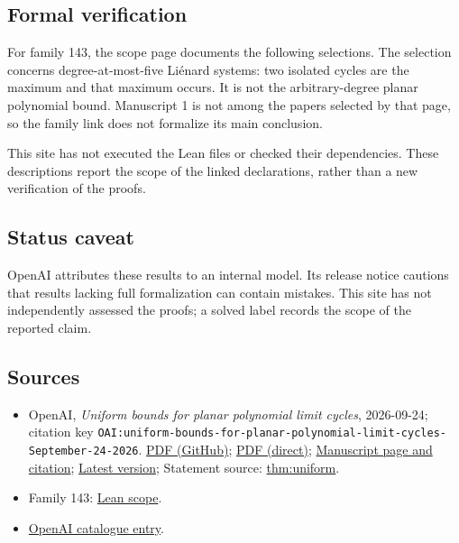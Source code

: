 \documentclass[11pt]{article}
\begin{document}
\subsection{Formal verification}
For family 143, the scope page documents the following selections. The selection concerns degree-at-most-five Liénard systems: two isolated cycles are the maximum and that maximum occurs. It is not the arbitrary-degree planar polynomial bound. Manuscript 1 is not among the papers selected by that page, so the family link does not formalize its main conclusion.

This site has not executed the Lean files or checked their dependencies. These descriptions report the scope of the linked declarations, rather than a new verification of the proofs.

\subsection{Status caveat}
OpenAI attributes these results to an internal model. Its release notice cautions that results lacking full formalization can contain mistakes. This site has not independently assessed the proofs; a solved label records the scope of the reported claim.

\subsection{Sources}
\begin{itemize}
\item OpenAI, \emph{Uniform bounds for planar polynomial limit cycles}, 2026-09-24; citation key \texttt{OAI:uniform-bounds-for-planar-polynomial-limit-cycles-September-24-2026}. \href{https://github.com/openai/math/blob/adc7f1241b42e322a6451854ab7e4b4c146bf78a/preprints/uniform-bounds-for-planar-polynomial-limit-cycles-September-24-2026/uniform-bounds-for-planar-polynomial-limit-cycles-September-24-2026.pdf}{PDF (GitHub)}; \href{https://github.com/openai/math/raw/adc7f1241b42e322a6451854ab7e4b4c146bf78a/preprints/uniform-bounds-for-planar-polynomial-limit-cycles-September-24-2026/uniform-bounds-for-planar-polynomial-limit-cycles-September-24-2026.pdf}{PDF (direct)}; \href{https://github.com/openai/math/blob/adc7f1241b42e322a6451854ab7e4b4c146bf78a/preprints/uniform-bounds-for-planar-polynomial-limit-cycles-September-24-2026/README.md}{Manuscript page and citation}; \href{https://github.com/openai/math/blob/main/preprints/uniform-bounds-for-planar-polynomial-limit-cycles-September-24-2026/uniform-bounds-for-planar-polynomial-limit-cycles-September-24-2026.pdf}{Latest version}; Statement source: \href{https://github.com/openai/math/blob/adc7f1241b42e322a6451854ab7e4b4c146bf78a/preprints/uniform-bounds-for-planar-polynomial-limit-cycles-September-24-2026/build/sections/01-introduction.tex\#L12}{thm:uniform}.
\item Family 143: \href{https://github.com/openai/math/blob/adc7f1241b42e322a6451854ab7e4b4c146bf78a/lean/docs/143.md}{Lean scope}.
\item \href{https://github.com/openai/math/blob/adc7f1241b42e322a6451854ab7e4b4c146bf78a/CONTENTS.md}{OpenAI catalogue entry}.
\end{itemize}
\end{document}
